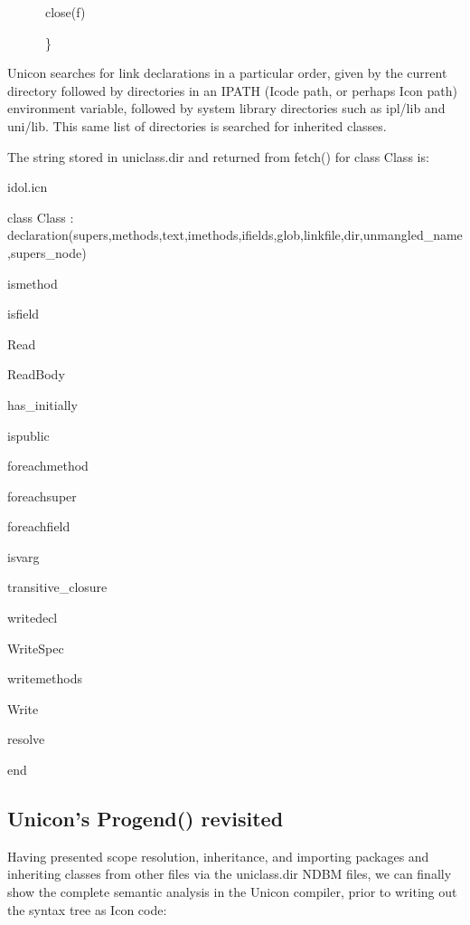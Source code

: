 {\ttfamily\mdseries
\ \ \ \ \ \ close(f)}

{\ttfamily\mdseries
\ \ \ \ \ \ \}}


Unicon searches for {\textquotedbl}link{\textquotedbl} declarations in
a particular order, given by the current directory followed by
directories in an IPATH (Icode path, or perhaps Icon path) environment
variable, followed by system library directories such as ipl/lib and
uni/lib. This same list of directories is searched for inherited
classes.


The string stored in uniclass.dir and returned from fetch() for class Class is: 

{\ttfamily\mdseries
idol.icn}

{\ttfamily\mdseries
class Class : declaration(supers,methods,text,imethods,ifields,glob,linkfile,dir,unmangled\_name,supers\_node)}

{\ttfamily\mdseries
ismethod}

{\ttfamily\mdseries
isfield}

{\ttfamily\mdseries
Read}

{\ttfamily\mdseries
ReadBody}

{\ttfamily\mdseries
has\_initially}

{\ttfamily\mdseries
ispublic}

{\ttfamily\mdseries
foreachmethod}

{\ttfamily\mdseries
foreachsuper}

{\ttfamily\mdseries
foreachfield}

{\ttfamily\mdseries
isvarg}

{\ttfamily\mdseries
transitive\_closure}

{\ttfamily\mdseries
writedecl}

{\ttfamily\mdseries
WriteSpec}

{\ttfamily\mdseries
writemethods}

{\ttfamily\mdseries
Write}

{\ttfamily\mdseries
resolve}

{\ttfamily\mdseries
end}

\subsection{Unicon's Progend() revisited}

Having presented scope resolution, inheritance, and importing packages
and inheriting classes from other files via the uniclass.dir NDBM
files, we can finally show the complete semantic analysis in the
Unicon compiler, prior to writing out the syntax tree as Icon code:

